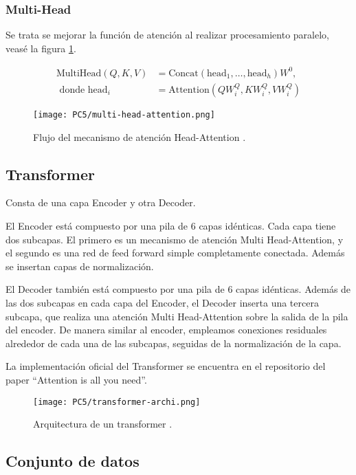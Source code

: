 \documentclass[conference]{IEEEtran}
\begin{document}
\subsubsection{Multi-Head}
Se trata se mejorar la función de atención al realizar procesamiento paralelo, veasé la figura \ref{fig::multi-head-attention}.

\begin{align*}
\text{MultiHead}(Q,K,V) &=\text{Concat}(\text{head}_1,\ldots,\text{head}_h)W^0, \\
\text{ donde } \text{head}_i &=\text{Attention}(QW^Q_i,KW^Q_i,VW^Q_i)
\end{align*}


\begin{figure}[ht]
\centering
\texttt{[image: PC5/multi-head-attention.png]}
\caption{Flujo del mecanismo de atención Head-Attention \cite{b4}.}
\label{fig::multi-head-attention}
\end{figure}


\subsection{Transformer}
Consta de una capa Encoder y otra Decoder. 

El Encoder está compuesto por una pila de 6 capas idénticas. Cada capa tiene dos subcapas. El primero es un mecanismo de atención  Multi Head-Attention,  y el segundo es una red de feed forward simple completamente conectada. Además se insertan capas de normalización.

El Decoder también está compuesto por una pila de 6 capas idénticas. Además de las dos subcapas en cada capa del Encoder, el Decoder inserta una tercera subcapa, que realiza una atención Multi Head-Attention sobre la salida de la pila del encoder. De manera similar al encoder, empleamos conexiones residuales alrededor de cada una de las subcapas, seguidas de la normalización de la capa.

La implementación oficial del Transformer se encuentra en el repositorio del paper \enquote{Attention is all you need}.

\begin{figure}[ht]
\centering
\texttt{[image: PC5/transformer-archi.png]}
\caption{Arquitectura de un transformer \cite{b4}.}
\label{fig::transformer-archi}
\end{figure}

\subsection{Conjunto de datos}
\end{document}
